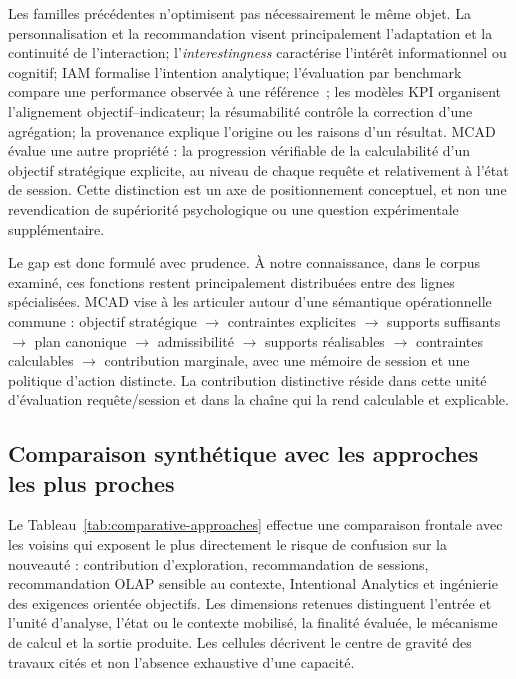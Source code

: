 \documentclass[journal]{IEEEtran}
\begin{document}
Les familles précédentes n'optimisent pas nécessairement le même objet. La personnalisation et la recommandation visent principalement l'adaptation et la continuité de l'interaction; l'\emph{interestingness} caractérise l'intérêt informationnel ou cognitif; IAM formalise l'intention analytique; l'évaluation par benchmark compare une performance observée à une référence~\cite{FranciaAssess2021}; les modèles KPI organisent l'alignement objectif--indicateur; la résumabilité contrôle la correction d'une agrégation; la provenance explique l'origine ou les raisons d'un résultat. MCAD évalue une autre propriété : la progression vérifiable de la calculabilité d'un objectif stratégique explicite, au niveau de chaque requête et relativement à l'état de session. Cette distinction est un axe de positionnement conceptuel, et non une revendication de supériorité psychologique ou une question expérimentale supplémentaire.

Le gap est donc formulé avec prudence. À notre connaissance, dans le corpus examiné, ces fonctions restent principalement distribuées entre des lignes spécialisées. MCAD vise à les articuler autour d'une sémantique opérationnelle commune : objectif stratégique $\rightarrow$ contraintes explicites $\rightarrow$ supports suffisants $\rightarrow$ plan canonique $\rightarrow$ admissibilité $\rightarrow$ supports réalisables $\rightarrow$ contraintes calculables $\rightarrow$ contribution marginale, avec une mémoire de session et une politique d'action distincte. La contribution distinctive réside dans cette unité d'évaluation requête/session et dans la chaîne qui la rend calculable et explicable.

\subsection{Comparaison synthétique avec les approches les plus proches}

Le Tableau~\ref{tab:comparative-approaches} effectue une comparaison frontale avec les voisins qui exposent le plus directement le risque de confusion sur la nouveauté : contribution d'exploration, recommandation de sessions, recommandation OLAP sensible au contexte, Intentional Analytics et ingénierie des exigences orientée objectifs. Les dimensions retenues distinguent l'entrée et l'unité d'analyse, l'état ou le contexte mobilisé, la finalité évaluée, le mécanisme de calcul et la sortie produite. Les cellules décrivent le centre de gravité des travaux cités et non l'absence exhaustive d'une capacité.
\end{document}
